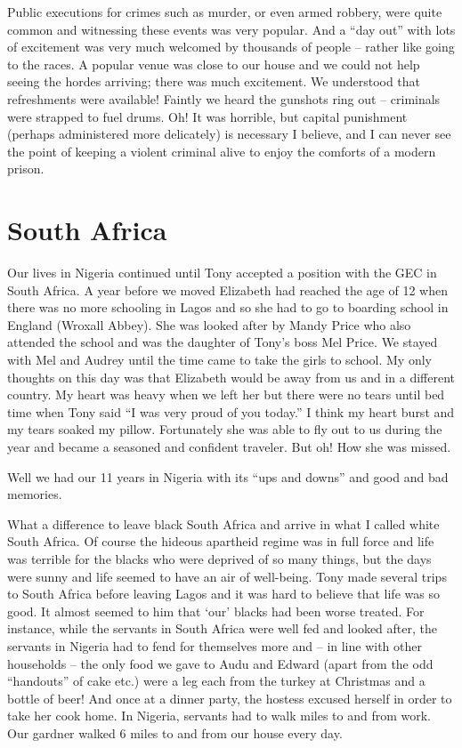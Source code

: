 Public executions for crimes such as murder, or even armed robbery,
were quite common and witnessing these events was very popular. And a
``day out'' with lots of excitement was very much welcomed by
thousands of people -- rather like going to the races. A popular venue
was close to our house and we could not help seeing the hordes
arriving; there was much excitement. We understood that refreshments
were available! Faintly we heard the gunshots ring out -- criminals
were strapped to fuel drums. Oh! It was horrible, but capital
punishment (perhaps administered more delicately) is necessary I
believe, and I can never see the point of keeping a violent criminal
alive to enjoy the comforts of a modern prison.


\chapter{South Africa}

Our lives in Nigeria continued until Tony accepted a position with the
GEC in South Africa. A year before we moved Elizabeth had reached the
age of 12 when there was no more schooling in Lagos and so she had to
go to boarding school in England (Wroxall Abbey). She was looked after
by Mandy Price who also attended the school and was the daughter of
Tony's boss Mel Price. We stayed with Mel and Audrey until the time
came to take the girls to school. My only thoughts on this day was
that Elizabeth would be away from us and in a different country. My
heart was heavy when we left her but there were no tears until bed
time when Tony said ``I was very proud of you today.'' I think my
heart burst and my tears soaked my pillow. Fortunately she was able to
fly out to us during the year and became a seasoned and confident
traveler. But oh! How she was missed.

Well we had our 11 years in Nigeria with its ``ups and downs'' and
good and bad memories.

What a difference to leave black South Africa and arrive in what I
called white South Africa. Of course the hideous apartheid regime was
in full force and life was terrible for the blacks who were deprived
of so many things, but the days were sunny and life seemed to have an
air of well-being. Tony made several trips to South Africa before
leaving Lagos and it was hard to believe that life was so good. It
almost seemed to him that ‘our’ blacks had been worse treated. For
instance, while the servants in South Africa were well fed and looked
after, the servants in Nigeria had to fend for themselves more and --
in line with other households -- the only food we gave to Audu and
Edward (apart from the odd ``handouts'' of cake etc.) were a leg each
from the turkey at Christmas and a bottle of beer! And once at a
dinner party, the hostess excused herself in order to take her cook
home. In Nigeria, servants had to walk miles to and from work. Our
gardner walked 6 miles to and from our house every day.

